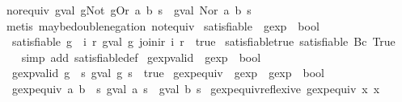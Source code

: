\begin{isabellebody}
\isamarkupfalse%
\ nor{\isacharunderscore}equiv{\isacharcolon}\ {\isachardoublequoteopen}gval\ {\isacharparenleft}gNot\ {\isacharparenleft}gOr\ a\ b{\isacharparenright}{\isacharparenright}\ s\ {\isacharequal}\ gval\ {\isacharparenleft}Nor\ a\ b{\isacharparenright}\ s{\isachardoublequoteclose}\isanewline
%
\isadelimproof
\ \ %
\endisadelimproof
%
\isatagproof
{}\isamarkupfalse%
\ {\isacharparenleft}metis\ maybe{\isacharunderscore}double{\isacharunderscore}negation\ not{\isacharunderscore}equiv{\isacharparenright}%
\endisatagproof
{\isafoldproof}%
%
\isadelimproof
\isanewline
%
\endisadelimproof
\isanewline
{}\isamarkupfalse%
\ satisfiable\ {\isacharcolon}{\isacharcolon}\ {\isachardoublequoteopen}gexp\ {\isasymRightarrow}\ bool{\isachardoublequoteclose}\ \isanewline
\ \ {\isachardoublequoteopen}satisfiable\ g\ {\isasymequiv}\ {\isacharparenleft}{\isasymexists}i\ r{\isachardot}\ gval\ g\ {\isacharparenleft}join{\isacharunderscore}ir\ i\ r{\isacharparenright}\ {\isacharequal}\ true{\isacharparenright}{\isachardoublequoteclose}\isanewline
\isanewline
{}\isamarkupfalse%
\ satisfiable{\isacharunderscore}true{\isacharcolon}\ {\isachardoublequoteopen}satisfiable\ {\isacharparenleft}Bc\ True{\isacharparenright}{\isachardoublequoteclose}\isanewline
%
\isadelimproof
\ \ %
\endisadelimproof
%
\isatagproof
{}\isamarkupfalse%
\ {\isacharparenleft}simp\ add{\isacharcolon}\ satisfiable{\isacharunderscore}def{\isacharparenright}%
\endisatagproof
{\isafoldproof}%
%
\isadelimproof
\isanewline
%
\endisadelimproof
\isanewline
{}\isamarkupfalse%
\ gexp{\isacharunderscore}valid\ {\isacharcolon}{\isacharcolon}\ {\isachardoublequoteopen}gexp\ {\isasymRightarrow}\ bool{\isachardoublequoteclose}\ \isanewline
\ \ {\isachardoublequoteopen}gexp{\isacharunderscore}valid\ g\ {\isasymequiv}\ {\isacharparenleft}{\isasymforall}s{\isachardot}\ gval\ g\ s\ {\isacharequal}\ true{\isacharparenright}{\isachardoublequoteclose}\isanewline
\isanewline
{}\isamarkupfalse%
\ gexp{\isacharunderscore}equiv\ {\isacharcolon}{\isacharcolon}\ {\isachardoublequoteopen}gexp\ {\isasymRightarrow}\ gexp\ {\isasymRightarrow}\ bool{\isachardoublequoteclose}\ \isanewline
\ \ {\isachardoublequoteopen}gexp{\isacharunderscore}equiv\ a\ b\ {\isasymequiv}\ {\isasymforall}s{\isachardot}\ gval\ a\ s\ {\isacharequal}\ gval\ b\ s{\isachardoublequoteclose}\isanewline
\isanewline
{}\isamarkupfalse%
\ gexp{\isacharunderscore}equiv{\isacharunderscore}reflexive{\isacharcolon}\ {\isachardoublequoteopen}gexp{\isacharunderscore}equiv\ x\ x{\isachardoublequoteclose}\isanewline

\end{isabellebody}
